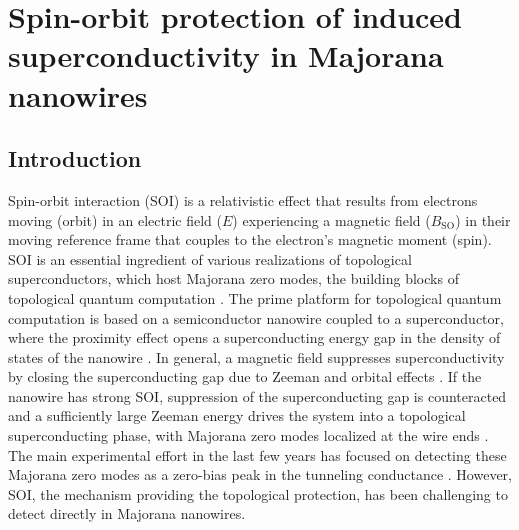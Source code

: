 \chapter{Spin-orbit protection of induced superconductivity in Majorana nanowires}
\label{ch:spinorbit}

\newpage
\noindent
\section{Introduction}

Spin-orbit interaction (SOI) is a relativistic effect that results from electrons moving (orbit) in an electric field ($E$) experiencing a magnetic field ($B_{\mathrm{SO}}$) in their moving reference frame that couples to the electron's magnetic moment (spin).
SOI is an essential ingredient of various realizations of topological superconductors, which host Majorana zero modes, the building blocks of topological quantum computation \cite{Kitaev2001,Fu2008,Nayak2008}.
The prime platform for topological quantum computation is based on a semiconductor nanowire coupled to a superconductor, where the proximity effect opens a superconducting energy gap in the density of states of the nanowire \cite{Lutchyn2010,Oreg2010}.
In general, a magnetic field suppresses superconductivity by closing the superconducting gap due to Zeeman and orbital effects \cite{Nijholt2016}.
If the nanowire has strong SOI, suppression of the superconducting gap is counteracted and a sufficiently large Zeeman energy drives the system into a topological superconducting phase, with Majorana zero modes localized at the wire ends \cite{Lutchyn2010,Oreg2010}.
The main experimental effort in the last few years has focused on detecting these Majorana zero modes as a zero-bias peak in the tunneling conductance \cite{Mourik2012,Albrecht2016,Deng2016,BalMaj,QZBP,LutchynReview,AguadoReview}.
However, SOI, the mechanism providing the topological protection, has been challenging to detect directly in Majorana nanowires.

